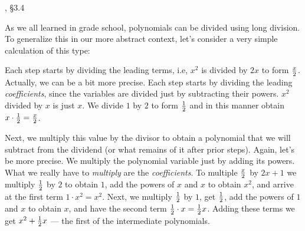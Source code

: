 \begin{comment}
There is only one way to extend an ordered integral domain into an
ordered quotient field.

Next, we introduce real numbers individually as Cauchy sequences and
collectively as an extension field, ordered by showing that the
trailing terms in such a sequence must either converge to zero or
become uniformly positive or negative, establishing O1.  A little more
work is then needed to show that O2 and O3 hold, and that the
Archemedian property carries through.

Next, we show that square roots always exist, as Cauchy sequences, for
all positive numbers.  This requires constructing a sequence of larger
and larger numbers, each of which we square, invert, multiply by 2,
and use A1 to demand an even larger element of {\bf Q}.  Fill in the
details.  Might need Archmedian property for this.

Next, construct ${\bf C}$ by extending algebraically to adjoin $i$,
and use the prior result to demonstrate that square roots exist for
all numbers in ${\bf C}$.  Then introduce the modulus of a complex
number and establish that $|1+\gamma|\le 1+|\gamma|$.

\end{comment}

, \S3.4

As we all learned in grade school, polynomials can be divided
using long division.  To generalize this in our more abstract
context, let's consider a very simple calculation of this type:



Each step starts by dividing the leading terms, i.e, $x^2$ is divided
by $2x$ to form $x\over 2$.  Actually, we can be a bit more precise.
Each step starts by dividing the leading {\it coefficients},
since the variables are divided just by subtracting their
powers. $x^2$ divided by $x$ is just $x$.  We divide $1$ by $2$
to form $1\over2$ and in this manner obtain $x\cdot{1\over2}={x\over2}$.

Next, we multiply this value by the divisor to obtain a polynomial
that we will subtract from the dividend (or what remains of it after
prior steps).  Again, let's be more precise.  We multiply the
polynomial variable just by adding its powers.  What we really have to
{\it multiply} are the {\it coefficients}.  To multiple $x\over2$ by
$2x+1$ we multiply $1\over2$ by $2$ to obtain $1$, add the powers of
$x$ and $x$ to obtain $x^2$, and arrive at the first term $1\cdot
x^2=x^2$.  Next, we multiply $1\over2$ by $1$, get $1\over2$, add the
powers of $1$ and $x$ to obtain $x$, and have the second term
${1\over2}\cdot x={1\over2}x$.  Adding these terms we get
$x^2+{1\over2}x$ --- the first of the intermediate polynomials.

